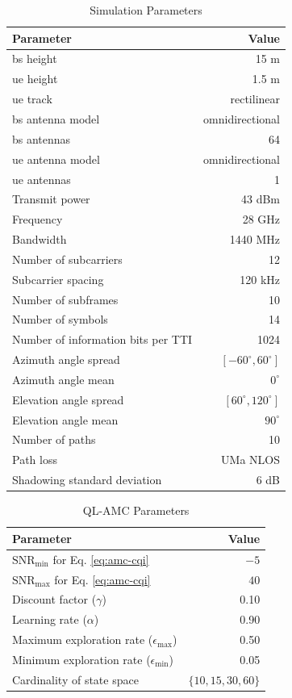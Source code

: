 \begin{table}[htb]
\centering
\caption{Simulation Parameters}
\label{tab:amc-sim-params}
\begin{tabularx}{0.8\columnwidth}{X r}
\toprule
\textbf{Parameter} 	& \textbf{Value} \\
\midrule
\gls{bs} height & 15 m\\
\gls{ue} height & 1.5 m\\
\gls{ue} track & rectilinear\\
\gls{bs}  antenna model & omnidirectional \\
\gls{bs}  antennas & 64 \\
\gls{ue} antenna model & omnidirectional \\
\gls{ue} antennas & 1 \\
Transmit power & 43 dBm\\
Frequency & 28 GHz\\
Bandwidth & 1440 MHz\\
Number of subcarriers  & 12\\
Subcarrier spacing & 120 kHz\\
Number of subframes & 10\\
Number of symbols & 14\\
Number of information bits per TTI & 1024\\
Azimuth angle spread & $[-60^{\circ}, 60^{\circ}]$\\
Azimuth angle mean & $0^{\circ}$\\
Elevation angle spread & $[60^{\circ}, 120^{\circ}]$\\
Elevation angle mean & $90^{\circ}$\\

Number of paths & 10\\
Path loss & UMa NLOS\\
Shadowing standard deviation & 6 dB\\
\bottomrule
\end{tabularx}
\end{table}
%


\begin{table}[htb]
	\centering
	\caption{QL-AMC Parameters}
	\label{tab:amc-rl-params}
	\begin{tabularx}{0.8\columnwidth}{l r}
		\toprule
		\textbf{Parameter} 	   & \textbf{Value} \\
    \midrule
    $\textrm{SNR}_{\text{min}}$ for Eq. \eqref{eq:amc-cqi} & $-5$ \\
    $\textrm{SNR}_{\text{max}}$ for Eq. \eqref{eq:amc-cqi} & $40$ \\
		Discount factor ($\gamma$) & 0.10\\
		Learning rate ($\alpha$) & 0.90\\
		Maximum exploration rate ($\epsilon_{\max}$) & 0.50\\
    Minimum exploration rate ($\epsilon_{\min}$) & 0.05\\
    Cardinality of state space & $\{10,15,30,60 \}$\\
		\bottomrule
	\end{tabularx}
\end{table}

